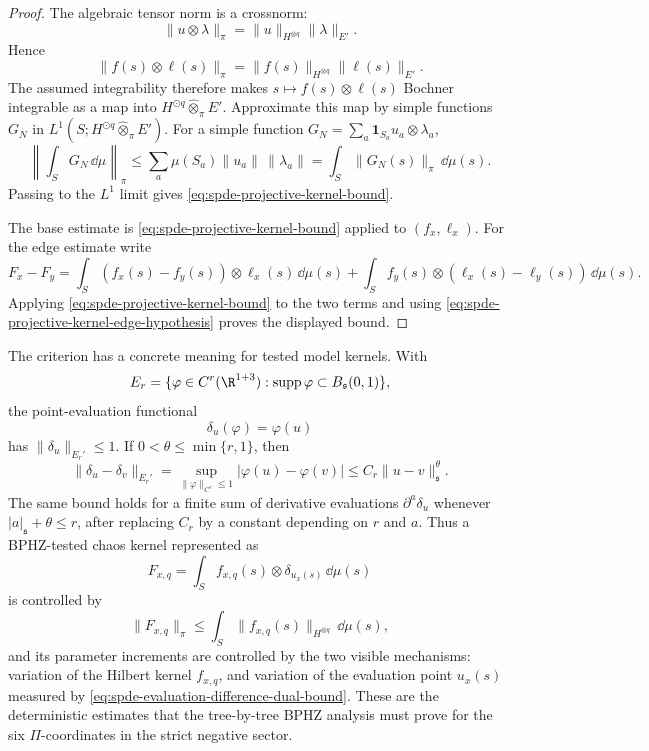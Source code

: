 \begin{proof}
The algebraic tensor norm is a crossnorm:
\[
  \|u\otimes\lambda\|_\pi=\|u\|_{H^{\otimes q}}\|\lambda\|_{E'}.
\]
Hence
\[
  \|f(s)\otimes\ell(s)\|_\pi
  =
  \|f(s)\|_{H^{\otimes q}}\|\ell(s)\|_{E'}.
\]
The assumed integrability therefore makes
\(s\mapsto f(s)\otimes\ell(s)\) Bochner integrable as a map into
\(H^{\odot q}\widehat\otimes_\pi E'\).  Approximate this map by simple
functions \(G_N\) in \(L^1(S;H^{\odot q}\widehat\otimes_\pi E')\).  For a
simple function \(G_N=\sum_a \mathbf 1_{S_a}u_a\otimes\lambda_a\),
\[
  \left\|\int_S G_N\,\dd\mu\right\|_\pi
  \leq
  \sum_a\mu(S_a)\|u_a\|\,\|\lambda_a\|
  =
  \int_S\|G_N(s)\|_\pi\,\dd\mu(s).
\]
Passing to the \(L^1\) limit gives
\eqref{eq:spde-projective-kernel-bound}.

The base estimate is
\eqref{eq:spde-projective-kernel-bound} applied to
\((f_x,\ell_x)\).  For the edge estimate write
\[
  F_x-F_y
  =
  \int_S (f_x(s)-f_y(s))\otimes\ell_x(s)\,\dd\mu(s)
  +
  \int_S f_y(s)\otimes(\ell_x(s)-\ell_y(s))\,\dd\mu(s).
\]
Applying \eqref{eq:spde-projective-kernel-bound} to the two terms and using
\eqref{eq:spde-projective-kernel-edge-hypothesis} proves the displayed bound.
\end{proof}

The criterion has a concrete meaning for tested model kernels.  With
\[
  E_r=\{\varphi\in C^r(\R^{1+3}):
  \operatorname{supp}\varphi\subset B_{\mathfrak s}(0,1)\},
\]
the point-evaluation functional
\[
  \delta_u(\varphi)=\varphi(u)
\]
has \(\|\delta_u\|_{E_r'}\leq1\).  If
\(0<\theta\leq\min\{r,1\}\), then
\begin{equation}
  \|\delta_u-\delta_v\|_{E_r'}
  =
  \sup_{\|\varphi\|_{C^r}\leq1}|\varphi(u)-\varphi(v)|
  \leq
  C_r\|u-v\|_{\mathfrak s}^{\theta}.
  \label{eq:spde-evaluation-difference-dual-bound}
\end{equation}
The same bound holds for a finite sum of derivative evaluations
\(\partial^a\delta_u\) whenever \(|a|_{\mathfrak s}+\theta\leq r\), after
replacing \(C_r\) by a constant depending on \(r\) and \(a\).  Thus a
BPHZ-tested chaos kernel represented as
\[
  F_{x,q}
  =
  \int_S f_{x,q}(s)\otimes\delta_{u_x(s)}\,\dd\mu(s)
\]
is controlled by
\[
  \|F_{x,q}\|_\pi
  \leq
  \int_S\|f_{x,q}(s)\|_{H^{\otimes q}}\,\dd\mu(s),
\]
and its parameter increments are controlled by the two visible mechanisms:
variation of the Hilbert kernel \(f_{x,q}\), and variation of the evaluation
point \(u_x(s)\) measured by
\eqref{eq:spde-evaluation-difference-dual-bound}.  These are the deterministic
estimates that the tree-by-tree BPHZ analysis must prove for the six
\(\Pi\)-coordinates in the strict negative sector.

